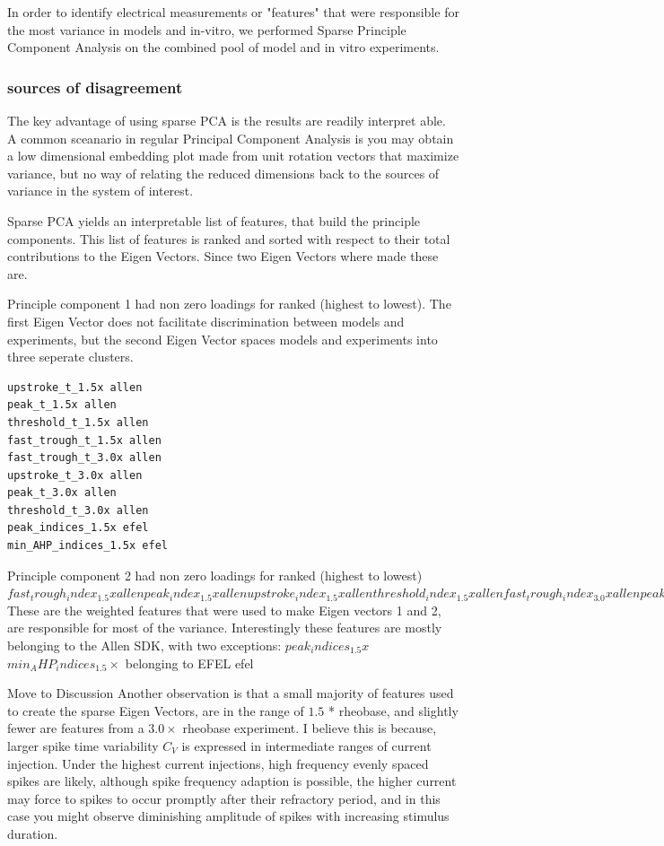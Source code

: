 In order to identify electrical measurements or "features" that were responsible for the most variance in models and in-vitro, we performed Sparse Principle Component Analysis \cite{zou2006sparse} on the combined pool of model and in vitro experiments. 



\subsubsection{sources of disagreement}

The key advantage of using sparse PCA is the results are readily interpret able. A common sceanario in regular Principal Component Analysis is you may obtain a low dimensional embedding plot made from unit rotation vectors that maximize variance, but no way of relating the reduced dimensions back to the sources of variance in the system of interest. 

Sparse PCA yields an interpretable list of features, that build the principle components. This list of features is ranked and sorted with respect to their total contributions to the Eigen Vectors. Since two Eigen Vectors where made these are.

Principle component 1 had non zero loadings for ranked (highest to lowest).
The first Eigen Vector does not facilitate discrimination between models and experiments, but the second Eigen Vector spaces models and experiments into three seperate clusters.
\begin{verbatim}
upstroke_t_1.5x allen 
peak_t_1.5x allen 
threshold_t_1.5x allen 
fast_trough_t_1.5x allen 
fast_trough_t_3.0x allen 
upstroke_t_3.0x allen 
peak_t_3.0x allen 
threshold_t_3.0x allen 
peak_indices_1.5x efel 
min_AHP_indices_1.5x efel 
\end{verbatim}


Principle component 2 had non zero loadings for ranked (highest to lowest)
$
fast_trough_index_1.5x allen 
peak_index_1.5x allen 
upstroke_index_1.5x allen 
threshold_index_1.5x allen 
fast_trough_index_3.0x allen 
peak_index_3.0x allen 
upstroke_index_3.0x allen 
threshold_index_3.0x allen
$
These are the weighted features that were used to make Eigen vectors 1 and 2, are responsible for most of the variance. Interestingly these features are mostly belonging to the Allen SDK, with two exceptions: $peak_indices_1.5x$ $min_AHP_indices_1.5 \times$ belonging to EFEL efel 

Move to Discussion 
Another observation is that a small majority of features used to create the sparse Eigen Vectors, are in the range of $1.5$ * rheobase, and slightly fewer are features from a $3.0\times$ rheobase experiment. I believe this is because, larger spike time variability $C_{V}$ is expressed in intermediate ranges of current injection. Under the highest current injections, high frequency evenly spaced spikes are likely, although spike frequency adaption is possible, the higher current may force to spikes to occur promptly after their refractory period, and in this case you might observe diminishing amplitude of spikes with increasing stimulus duration.

